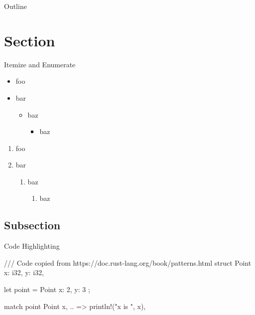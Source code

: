 
\begin{frame}[plain]
  \titlepage
\end{frame}

\begin{frame}{Outline}
\tableofcontents
\end{frame}

\section{Section}


\begin{frame}{Itemize and Enumerate}
    \begin{itemize}
      \item foo
      \item bar
        \begin{itemize}
          \item baz
            \begin{itemize}
              \item baz
            \end{itemize}
        \end{itemize}
    \end{itemize}
    \begin{enumerate}
      \item foo
      \item bar
        \begin{enumerate}
          \item baz
            \begin{enumerate}
              \item baz
            \end{enumerate}
        \end{enumerate}
    \end{enumerate}
\end{frame}

\subsection{Subsection}
\begin{frame}[fragile]{Code Highlighting}
  \begin{rustcode}
  /// Code copied from https://doc.rust-lang.org/book/patterns.html
  struct Point {
      x: i32,
      y: i32,
  }

  let point = Point { x: 2, y: 3 };

  match point {
      Point { x, .. } => println!("x is {}", x),
  }
  \end{rustcode}
\end{frame}


